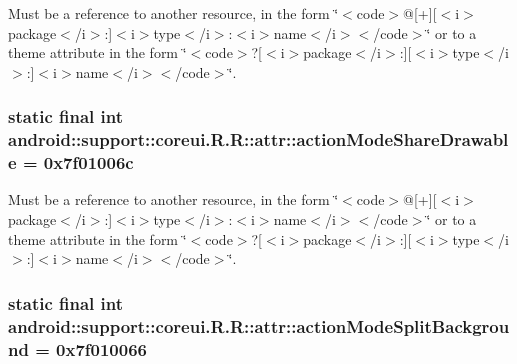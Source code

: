 Must be a reference to another resource, in the form \char`\"{}$<$code$>$@\mbox{[}+\mbox{]}\mbox{[}$<$i$>$package$<$/i$>$:\mbox{]}$<$i$>$type$<$/i$>$:$<$i$>$name$<$/i$>$$<$/code$>$\char`\"{} or to a theme attribute in the form \char`\"{}$<$code$>$?\mbox{[}$<$i$>$package$<$/i$>$:\mbox{]}\mbox{[}$<$i$>$type$<$/i$>$:\mbox{]}$<$i$>$name$<$/i$>$$<$/code$>$\char`\"{}. \hypertarget{classandroid_1_1support_1_1coreui_1_1_r_1_1attr_87d9d7607b7ec84e0fddb65442d7201e}{
\subsubsection[{actionModeShareDrawable}]{\setlength{\rightskip}{0pt plus 5cm}static final int android::support::coreui.R.R::attr::actionModeShareDrawable = 0x7f01006c}}
\label{classandroid_1_1support_1_1coreui_1_1_r_1_1attr_87d9d7607b7ec84e0fddb65442d7201e}


Must be a reference to another resource, in the form \char`\"{}$<$code$>$@\mbox{[}+\mbox{]}\mbox{[}$<$i$>$package$<$/i$>$:\mbox{]}$<$i$>$type$<$/i$>$:$<$i$>$name$<$/i$>$$<$/code$>$\char`\"{} or to a theme attribute in the form \char`\"{}$<$code$>$?\mbox{[}$<$i$>$package$<$/i$>$:\mbox{]}\mbox{[}$<$i$>$type$<$/i$>$:\mbox{]}$<$i$>$name$<$/i$>$$<$/code$>$\char`\"{}. \hypertarget{classandroid_1_1support_1_1coreui_1_1_r_1_1attr_9114b78b0f2615717facbcda387c3d5d}{
\subsubsection[{actionModeSplitBackground}]{\setlength{\rightskip}{0pt plus 5cm}static final int android::support::coreui.R.R::attr::actionModeSplitBackground = 0x7f010066}}
\label{classandroid_1_1support_1_1coreui_1_1_r_1_1attr_9114b78b0f2615717facbcda387c3d5d}


